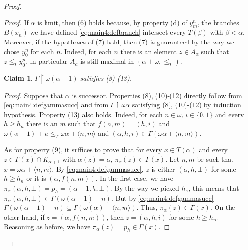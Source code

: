 \documentclass[]{amsart}
\newtheorem{claim}{Claim}[theorem]
\theoremstyle{definition}
\theoremstyle{remark}
\begin{document}
\begin{proof}
\begin{proof}
If $\alpha$ is limit, then (6) holds because, by property (d) of $y^n_m$, the branches $B(x_n)$ we have defined \eqref{eq:main4:defbranch} intersect every $T(\beta)$ with $\beta < \alpha$. Moreover, if the hypotheses of (7) hold, then (7) is guaranteed by the way we chose $y^n_0$ for each $n$. Indeed, for each $n$ there is an element $z \in A_\alpha$ such that $z \le_T y^n_0$. In particular $A_\alpha$ is still maximal in $(\alpha+\omega, \le_T)$.
\end{proof}

\begin{claim}
$\Gamma \upharpoonright \omega(\alpha+1)$ satisfies {\upshape (8)-(13)}.
\end{claim}
\begin{proof}
Suppose that $\alpha$ is successor. Properties (8), (10)-(12) directly follow from \eqref{eq:main4:defgammasucc} and from $\Gamma \upharpoonright \omega\alpha$ satisfying (8), (10)-(12) by induction hypothesis. Property (13) also holds. Indeed, for each $n\in\omega$, $i \in \{0,1\}$ and every $h \ge h_n$ there is an $m$ such that $f(n,m) = (h, i)$ and $\omega (\alpha-1)+n \le_T \omega \alpha + \langle n, m\rangle$ and $(\alpha, h, i) \in \Gamma (\omega\alpha + \langle n, m\rangle)$. 

As for property (9), it suffices to prove that for every $x \in T(\alpha)$ and every $z \in \Gamma(x) \cap K_{\alpha+1}$ with $\alpha(z)  = \alpha$, $\pi_\alpha (z) \in \Gamma(x)$. Let $n,m$ be such that $x = \omega\alpha + \langle n, m\rangle$. By \eqref{eq:main4:defgammasucc}, $z$ is either $(\alpha, h ,\bot)$ for some $h \ge h_n$ or it is $(\alpha, f(n,m))$. In the first case, we have $\pi_\alpha (\alpha, h, \bot) = p_h = (\alpha-1, h, \bot)$. By the way we picked $h_n$, this means that $\pi_\alpha(\alpha, h, \bot) \in \Gamma (\omega(\alpha-1) + n)$. But by \eqref{eq:main4:defgammasucc} $\Gamma (\omega(\alpha-1) + n) \subseteq \Gamma (\omega(\alpha) + \langle n, m\rangle)$. Thus, $\pi_\alpha (z) \in \Gamma(x)$. On the other hand, if $z = (\alpha, f(n,m))$, then $z = (\alpha, h, i)$ for some $h \ge h_n$. Reasoning as before, we have $\pi_\alpha (z)  = p_h \in \Gamma(x)$. 



\end{proof}
\end{proof}
\end{document}
